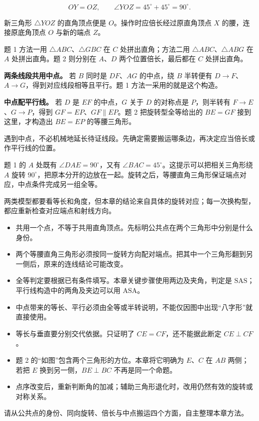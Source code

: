 \[
OY=OZ,\qquad
\angle YOZ=45^\circ+45^\circ=90^\circ.
\]

新三角形 \(\triangle YOZ\) 的直角顶点便是 \(O\)。操作时应倍长经过原直角顶点 \(X\) 的腰，连接原底角顶点 \(O\) 与新的端点 \(Z\)。

题 1 方法一用 \(\triangle ABC\)、\(\triangle GBC\) 在 \(C\) 处拼出直角；方法二用 \(\triangle ABC\)、\(\triangle ABG\) 在 \(A\) 处拼出直角。题 2 则分别在 \(A\)、\(D\) 两个位置倍长，最后都在 \(C\) 处拼出直角。


\textbf{两条线段共用中点。} 若 \(B\) 同时是 \(DF\)、\(AG\) 的中点，绕 \(B\) 半转便有 \(D\to F\)、\(A\to G\)，得到对应线段相等且平行。题 1 方法一采用的就是这个构造。

\textbf{中点配平行线。} 若 \(D\) 是 \(EF\) 的中点，\(G\) 关于 \(D\) 的对称点是 \(P\)，则半转有 \(F\to E\)、\(G\to P\)，得到 \(GF=EP\)、\(GF\parallel EP\)。题 2 把旋转型全等给出的 \(BE=GF\) 接到这里，才构造出 \(BE=EP\) 的等腰三角形。

遇到中点，不必机械地延长待证线段。先确定需要搬运哪条边，再决定应当倍长或作平行线的位置。


题 1 的 \(A\) 处既有 \(\angle DAE=90^\circ\)，又有 \(\angle BAC=45^\circ\)。这提示可以把相关三角形绕 \(A\) 旋转 \(90^\circ\)，把原本分开的边放在一起。旋转之后，等腰直角三角形保证端点对应，中点条件完成另一组全等。

两类模型都要看等长和角度，但本章的结论来自具体的旋转对应；每一次换构型，都应重新检查对应端点和射线方向。


\begin{itemize}
\item 共用一个点，不等于共用直角顶点。先标明公共点在两个三角形中分别是什么身份。
\item 两个等腰直角三角形必须按同一旋转方向配对端点。把其中一个三角形翻到另一侧后，原来的连线结论可能改变。
\item 全等判定要根据已有条件填写。本章关键步骤使用两边及夹角，判定是 \(\mathrm{SAS}\)；平行线构造中的两角及夹边可以用 \(\mathrm{ASA}\)。
\item 中点带来的等长、平行必须由全等或半转说明，不能仅因图中出现“八字形”就直接使用。
\item 等长与垂直要分别交代依据。只证明了 \(CE=CF\)，还不能据此断定 \(CE\perp CF\)。
\item 题 2 的“如图”包含两个三角形的方位。本章将它明确为 \(E\)、\(C\) 在 \(AB\) 两侧；若把 \(E\) 换到另一侧，\(BE\perp BC\) 不再是同一个命题。
\item 点序改变后，重新判断角的加减；辅助三角形退化时，改用仍然有效的旋转或对称关系。
\end{itemize}
\else
请从公共点的身份、同向旋转、倍长与中点搬运四个方面，自主整理本章方法。
\fi
